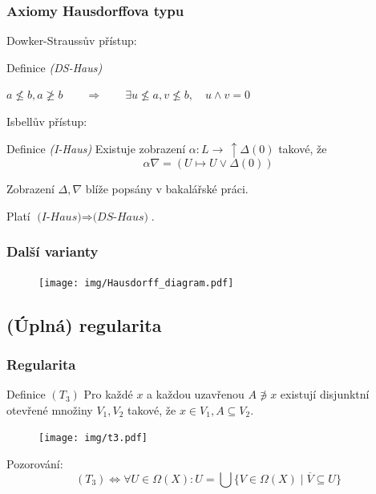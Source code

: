 \documentclass[mathserif]{beamer}
\newcommand{\dL}{\, \uparrow \Delta(0)}
\newcommand{\st}{\mid}
\begin{document}
\begin{frame}
\frametitle{Axiomy Hausdorffova typu}

Dowker-Straussův přístup:
\pause
\begin{block}{Definice \textit{(DS-Haus)}}
  \begin{center}
    $a \not\le b, a \not\ge b \qquad \Rightarrow \qquad \exists u\not\leq a,
    v\not\leq b, \quad u \wedge v = 0$
  \end{center}
\end{block}
\pause

Isbellův přístup:
\pause
\begin{block}{Definice \textit{(I-Haus)}}
  Existuje zobrazení $\alpha\colon L \to \dL$ takové, že
  \[
    \alpha \nabla = (U \mapsto U \vee \Delta(0))
  \]
\end{block}
Zobrazení $\Delta, \nabla$ blíže popsány v bakalářské práci.
\pause

\medskip

Platí \alert{$\textit{(I-Haus)} \Rightarrow \textit{(DS-Haus)}$.}
\end{frame}


\begin{frame}
\frametitle{Další varianty}
\pause

\begin{figure}
  \texttt{[image: img/Hausdorff\_diagram.pdf]}
\end{figure}
\end{frame}


\subsection{(Úplná) regularita}

\begin{frame}
\frametitle{Regularita}

\begin{block}{Definice $(T_3)$}
  Pro každé $x$ a každou uzavřenou $A \not\owns x$ existují disjunktní otevřené
  množiny $V_1, V_2$ takové, že $x \in V_1, A \subseteq V_2$.
\end{block}

\begin{figure}
  \texttt{[image: img/t3.pdf]}
\end{figure}
\pause

Pozorování:
\[
  (T_3) \Longleftrightarrow \forall U\in \Omega(X)\colon U = \bigcup \{V\in
  \Omega(X) \st \overline{V} \subseteq U\}
\]
\end{frame}
\end{document}

